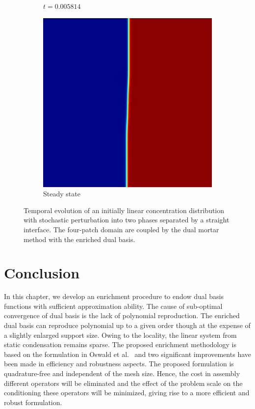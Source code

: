 \begin{figure}[ht]
\begin{subfigure}[t]{.3\linewidth}
		\vspace{-.4\baselineskip}
		\caption{{$t=0.005814$}}
	\end{subfigure}
	\begin{subfigure}[t]{.3\linewidth}
		\center
		\includegraphics[scale=.25]{linear_ch_8}
		\vspace{-.4\baselineskip}
		\caption{Steady state}
	\end{subfigure}
	\caption{Temporal evolution of an initially linear concentration distribution with stochastic perturbation into two phases separated by a straight interface. The four-patch domain are coupled by the dual mortar method with the enriched dual basis.}\label{fig:phase_field_linear}
\end{figure}

\section{Conclusion}\label{sec:conlusion}

In this chapter, we develop an enrichment procedure to endow \Bezier dual basis functions with sufficient approximation ability. The cause of sub-optimal convergence of \Bezier dual basis is the lack of polynomial reproduction. The enriched \Bezier dual basis can reproduce polynomial up to a given order though at the expense of a slightly enlarged support size. Owing to the locality, the linear system from static condensation remains sparse. The proposed enrichment methodology is based on the formulation in Oswald et al.~\cite{oswald2001polynomial} and two significant improvements have been made in efficiency and robustness aspects. The proposed formulation is quadrature-free and independent of the mesh size. Hence, the cost in assembly different operators will be eliminated and the effect of the problem scale on the conditioning these operators will be minimized, giving rise to a more efficient and robust formulation. \par

